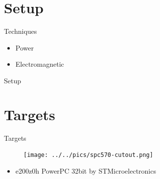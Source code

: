 \documentclass[table]{beamer}
\begin{document}
\section{Setup}

\begin{frame}
    \tableofcontents[currentsection]
\end{frame}

\begin{frame}{Techniques}
    \begin{itemize}
        \item Power
        \item Electromagnetic
    \end{itemize}
\end{frame}

\begin{frame}{Setup}
    \begin{figure}[H]
    \centering
    \def\svgwidth{\columnwidth}
    
    \end{figure}
\end{frame}

%     


\section{Targets}
\begin{frame}
    \tableofcontents[currentsection]
\end{frame}

\begin{frame}[t]{Targets}
    \begin{figure}[H]
      \centering
      \texttt{[image: ../../pics/spc570-cutout.png]}
    \end{figure}

    \begin{itemize}
        \item e200z0h PowerPC 32bit by STMicroelectronics  
    \end{itemize}
\end{frame}
\end{document}
